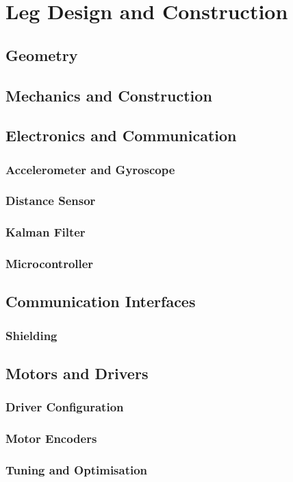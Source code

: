 \chapter{Leg Design and Construction}
\section{Geometry}
\section{Mechanics and Construction}
\section{Electronics and Communication}
\subsection{Accelerometer and Gyroscope}
\subsection{Distance Sensor}
\subsection{Kalman Filter}
\subsection{Microcontroller}
\section{Communication Interfaces}
\subsection{Shielding}
\section{Motors and Drivers}
\subsection{Driver Configuration}
\subsection{Motor Encoders}
\subsection{Tuning and Optimisation}
